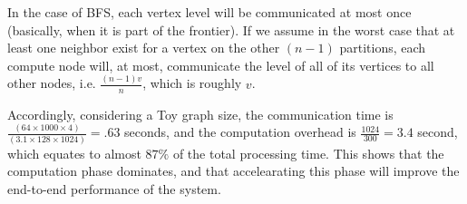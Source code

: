 In the case of BFS, each vertex level will be communicated at most once (basically, when it is part of the frontier). If we assume in the worst case that at least one neighbor exist for a vertex on the other $(n-1)$ partitions, each compute node will, at most, communicate the level of all of its vertices to all other nodes, i.e. $\frac{(n-1)v}{n}$, which is roughly $v$. 

Accordingly, considering a Toy graph size, the communication time is $\frac{(64 \times 1000 \times 4)}{(3.1 \times 128 \times 1024)} = .63$ seconds, and the computation overhead is $\frac{1024}{300} = 3.4$ second, which equates to almost $87\%$ of the total processing time. This shows that the computation phase dominates, and that accelearating this phase will improve the end-to-end performance of the system.
